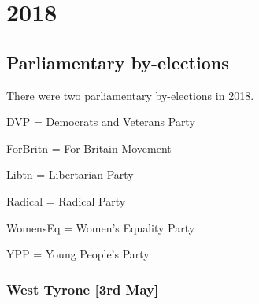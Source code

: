 \renewcommand\resultsyear{2018}

\part{2018}

%

%
%


\chapter{Parliamentary by-elections}

There were two parliamentary by-elections in 2018.

DVP = Democrats and Veterans Party

ForBritn = For Britain Movement

Libtn = Libertarian Party

Radical = Radical Party

WomensEq = Women's Equality Party

YPP = Young People's Party
%
%
%
\section*{West Tyrone \hspace*{\fill}\nolinebreak[1]%
\enspace\hspace*{\fill}
[3rd May]}

